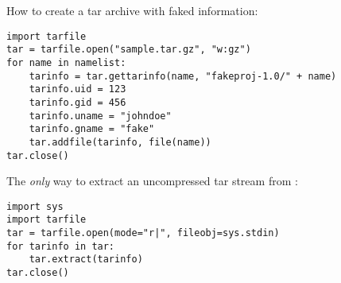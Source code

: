 How to create a tar archive with faked information:
\begin{verbatim}
import tarfile
tar = tarfile.open("sample.tar.gz", "w:gz")
for name in namelist:
    tarinfo = tar.gettarinfo(name, "fakeproj-1.0/" + name)
    tarinfo.uid = 123
    tarinfo.gid = 456
    tarinfo.uname = "johndoe"
    tarinfo.gname = "fake"
    tar.addfile(tarinfo, file(name))
tar.close()
\end{verbatim}

The \emph{only} way to extract an uncompressed tar stream from
:
\begin{verbatim}
import sys
import tarfile
tar = tarfile.open(mode="r|", fileobj=sys.stdin)
for tarinfo in tar:
    tar.extract(tarinfo)
tar.close()
\end{verbatim}
